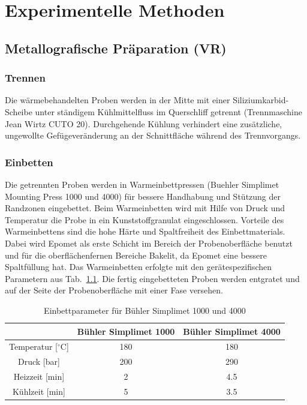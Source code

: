 \chapter{Experimentelle Methoden}

\section {Metallografische Präparation (VR)}

\subsection*{Trennen}

Die wärmebehandelten Proben werden in der Mitte mit einer Siliziumkarbid-Scheibe unter ständigem Kühlmittelfluss im Querschliff getrennt (Trennmaschine Jean Wirtz CUTO 20). Durchgehende Kühlung  verhindert eine zusätzliche, ungewollte Gefügeveränderung an der Schnittfläche während des Trennvorgangs.


\subsection*{Einbetten}

Die getrennten Proben werden in Warmeinbettpressen (Buehler Simplimet Mounting Press 1000 und 4000) für bessere Handhabung und Stützung der Randzonen eingebettet. Beim Warmeinbetten wird mit Hilfe von Druck und Temperatur die Probe in ein Kunststoffgranulat eingeschlossen. Vorteile des Warmeinbettens sind die hohe Härte und Spaltfreiheit des Einbettmaterials. Dabei wird Epomet als erste Schicht im Bereich der Probenoberfläche benutzt und für die oberflächenfernen Bereiche Bakelit, da Epomet eine bessere Spaltfüllung hat. Das Warmeinbetten erfolgte mit den gerätespezifischen Parametern aus Tab.~\ref{tab:Einbettpressen}. 
Die fertig eingebetteten Proben werden entgratet und auf der Seite der Probenoberfläche mit einer Fase versehen.  


\begin{table}[h]
	\centering
	\begin{tabular} {|c|c|c|}
		\hline
		&Bühler Simplimet 1000 & Bühler Simplimet 4000 \\
		\hline
		Temperatur [$^\circ$C]&180&180 \\
		\hline
		Druck [bar]&200&290 \\
		\hline
		Heizzeit [min]&2&4.5 \\
		\hline
		Kühlzeit [min]&5&3.5 \\
		\hline
	\end{tabular}
	
	\caption{Einbettparameter für Bühler Simplimet 1000 und 4000}
	\label{tab:Einbettpressen}
\end{table}

